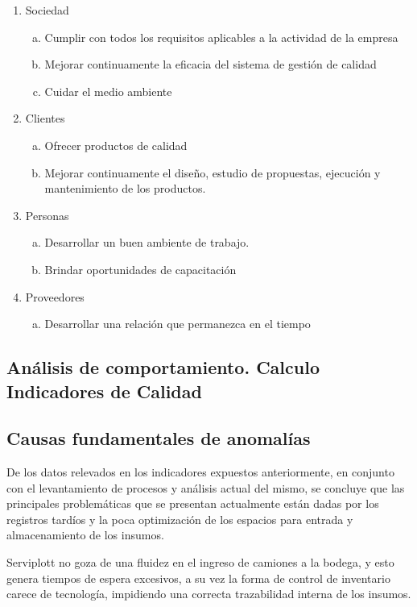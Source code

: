 		\begin{enumerate}[1)]
		\item Sociedad
		  \begin{enumerate}[a)]
		  \item Cumplir con todos los requisitos aplicables a la actividad de la empresa
		  \item  Mejorar continuamente la eficacia del sistema de gestión de calidad
		  \item  Cuidar el medio ambiente
		  \end{enumerate}
		\item Clientes
		  \begin{enumerate}[a)]
		  \item Ofrecer productos de calidad
		  \item Mejorar continuamente el diseño, estudio de propuestas, ejecución y mantenimiento de los productos.
		  \end{enumerate}
		\item Personas
		  \begin{enumerate}[a)]
		  \item Desarrollar un buen ambiente de trabajo.
		  \item Brindar oportunidades de capacitación
		  \end{enumerate}
		\item Proveedores
		  \begin{enumerate}[a)]
		  \item Desarrollar una relación que permanezca en el tiempo
		  \end{enumerate}
		\end{enumerate}
	
	\subsection{Análisis de comportamiento. Calculo Indicadores de Calidad}
	
	
	\subsection{Causas fundamentales de anomalías}
	De los datos relevados en los indicadores expuestos anteriormente, en conjunto con el levantamiento de procesos y análisis actual del mismo, se concluye que las principales problemáticas que se presentan actualmente están dadas por los registros tardíos y la poca optimización de los espacios para entrada y almacenamiento de los insumos.
	
	
	Serviplott no goza de una fluidez en el ingreso de camiones a la bodega, y esto genera tiempos de espera excesivos, a su vez la forma de control de inventario carece de tecnología, impidiendo una correcta trazabilidad interna de los insumos.
	

